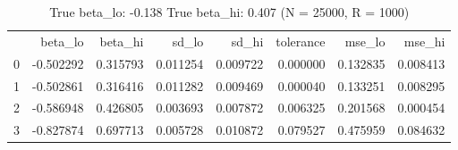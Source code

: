 \begin{table}
\caption{True beta_lo: -0.138 True beta_hi: 0.407 (N = 25000, R = 1000)}
\begin{tabular}{lrrrrrrr}
 & beta_lo & beta_hi & sd_lo & sd_hi & tolerance & mse_lo & mse_hi \\
0 & -0.502292 & 0.315793 & 0.011254 & 0.009722 & 0.000000 & 0.132835 & 0.008413 \\
1 & -0.502861 & 0.316416 & 0.011282 & 0.009469 & 0.000040 & 0.133251 & 0.008295 \\
2 & -0.586948 & 0.426805 & 0.003693 & 0.007872 & 0.006325 & 0.201568 & 0.000454 \\
3 & -0.827874 & 0.697713 & 0.005728 & 0.010872 & 0.079527 & 0.475959 & 0.084632 \\
\end{tabular}
\end{table}

